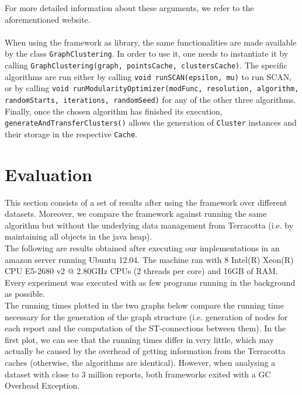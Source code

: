 \documentclass{article}
\begin{document}
		For more detailed information about these arguments, we refer to the aforementioned website.\\ \\
		When using the framework as library, the same functionalities are made available by the class
		\texttt{GraphClustering}. In order to use it, one needs to instantiate it by calling
		\texttt{GraphClustering(graph, pointsCache, clustersCache)}. The specific
		algorithms are run either by calling \texttt{void runSCAN(epsilon, mu)} to run SCAN, or
		by calling 
		\texttt{void runModularityOptimizer(modFunc, resolution, algorithm, randomStarts, 
		iterations, randomSeed)} for any of the other three algorithms. Finally, once the 
		chosen algorithm has finished its execution, \texttt{generateAndTransferClusters()}
		allows the generation of \texttt{Cluster} instances and their storage in the respective
		\texttt{Cache}.
	\section{Evaluation}
	\label{evaluation}
		This section consists of a set of results after using the framework over different datasets. 
		Moreover, we compare the framework against running the same algorithm but without the underlying
		data management from Terracotta (i.e. by maintaining all objects in the java heap).\\
		The following are results obtained after executing our implementations in an amazon server
		running Ubuntu 12.04. The machine ran with 8 Intel(R) Xeon(R) CPU E5-2680 v2 @ 2.80GHz CPUs (2 threads per core)
		and 16GB of RAM. Every experiment was executed with as few programs running in the background 
		as possible.\\
		The running times plotted in the two graphs below compare the running time necessary for the 
		generation of the graph structure (i.e. generation of nodes for each report and the computation
		of the ST-connections between them). In the first plot, we can see that the running times differ
		in very little, which may actually be caused by the overhead of getting information from the
		Terracotta caches (otherwise, the algorithms are identical). However, when analysing a
		dataset with close to 3 million reports, both frameworks exited with a GC Overhead Exception.
		
\end{document}
